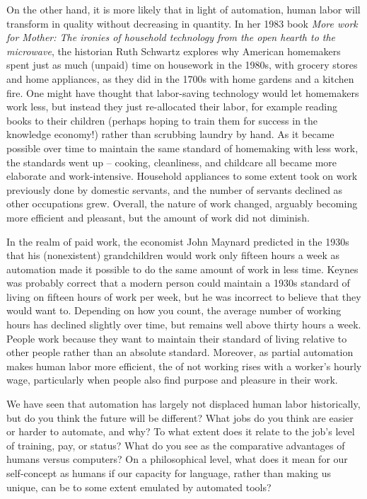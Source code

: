 On the other hand, it is more likely that in light of automation, human labor will transform in quality without decreasing in quantity.  In her 1983 book \textit{More work for Mother: The ironies of household technology from the open hearth to the microwave}, the historian Ruth Schwartz \citet{Cowan:1983} explores why American homemakers spent just as much (unpaid) time on housework in the 1980s, with grocery stores and home appliances,  as they did in the 1700s with home gardens and a kitchen fire.  One might have thought that labor-saving technology would let homemakers  work less, but instead they just re-allocated their labor, for example reading books to their children (perhaps hoping to train them for success in the knowledge economy!) rather than scrubbing laundry by hand. As it became possible over time to maintain the same standard of homemaking with less work, the standards went up -- cooking, cleanliness, and childcare all became more elaborate and work-intensive.  Household appliances to some extent took on work previously done by domestic servants, and the number of servants declined as other occupations grew.  Overall, the nature of work changed, arguably becoming more efficient and pleasant, but the amount of work did not diminish.


In the realm of paid work, the economist John Maynard \citet{Keynes:1931} predicted in the 1930s that his (nonexistent) grandchildren would work only fifteen hours a week as automation made it possible to do the same amount of work in less time.  Keynes was probably correct that a modern person could  maintain a 1930s standard of living on fifteen hours of work per week, but he was incorrect to believe that they would want to.  Depending on how you count, the average number of working hours has declined slightly over time, but remains well above thirty hours a week.  People work because they want to maintain their  standard of living relative to other people rather than an absolute standard.  Moreover, as partial automation makes human labor  more efficient,  the  of not working rises with a worker's hourly wage, particularly when people also find  purpose and pleasure in their work.


We have seen that automation has largely not displaced human labor historically, but do you think the future will be different?  What jobs do you think are easier or harder to automate, and why?  To what extent does it relate to the job's level of training, pay, or status?   What do you see as the comparative  advantages of humans versus computers?  
On a philosophical level, what does it mean for our self-concept as humans if our capacity for language, rather than making us unique, can be to some extent emulated by automated tools?

